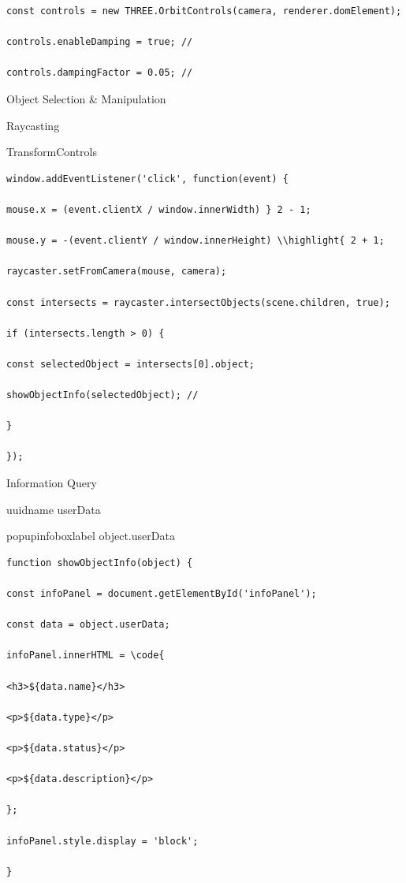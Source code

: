 \begin{lstlisting}[style=javascript]
const controls = new THREE.OrbitControls(camera, renderer.domElement);

controls.enableDamping = true; // 

controls.dampingFactor = 0.05; // 
\end{lstlisting}

Object Selection \& Manipulation

Raycasting

TransformControls

\begin{lstlisting}[style=javascript]
window.addEventListener('click', function(event) {

mouse.x = (event.clientX / window.innerWidth) } 2 - 1;

mouse.y = -(event.clientY / window.innerHeight) \\highlight{ 2 + 1;

raycaster.setFromCamera(mouse, camera);

const intersects = raycaster.intersectObjects(scene.children, true);

if (intersects.length > 0) {

const selectedObject = intersects[0].object;

showObjectInfo(selectedObject); // 

}

});
\end{lstlisting}

Information Query

uuidname userData

popupinfoboxlabel object.userData

\begin{lstlisting}[style=javascript]
function showObjectInfo(object) {

const infoPanel = document.getElementById('infoPanel');

const data = object.userData;

infoPanel.innerHTML = \code{

<h3>${data.name}</h3>

<p>${data.type}</p>

<p>${data.status}</p>

<p>${data.description}</p>

};

infoPanel.style.display = 'block';

}
\end{lstlisting}

